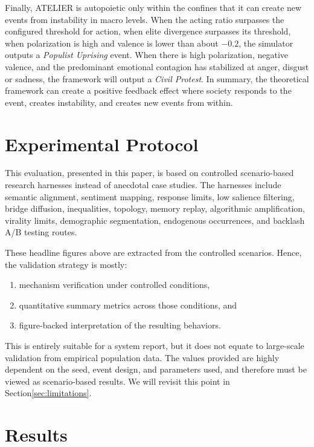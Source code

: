 \documentclass[12pt]{IEEEtran}
\begin{document}
Finally, ATELIER is autopoietic only within the confines that it can create new events from instability in macro levels. When the acting ratio surpasses the configured threshold for action, when elite divergence surpasses its threshold, when polarization is high and valence is lower than about $-0.2$, the simulator outputs a \emph{Populist Uprising} event. When there is high polarization, negative valence, and the predominant emotional contagion has stabilized at anger, disgust or sadness, the framework will output a \emph{Civil Protest}. In summary, the theoretical framework can create a positive feedback effect where society responds to the event, creates instability, and creates new events from within.

\section{Experimental Protocol}
\label{sec:protocol}
This evaluation, presented in this paper, is based on controlled scenario-based research harnesses instead of anecdotal case studies. The harnesses include semantic alignment, sentiment mapping, response limits, low salience filtering, bridge diffusion, inequalities, topology, memory replay, algorithmic amplification, virality limits, demographic segmentation, endogenous occurrences, and backlash A/B testing routes.

These headline figures above are extracted from the controlled scenarios. Hence, the validation strategy is mostly:

\begin{enumerate}
    \item mechanism verification under controlled conditions,
    \item quantitative summary metrics across those conditions, and
    \item figure-backed interpretation of the resulting behaviors.
\end{enumerate}

This is entirely suitable for a system report, but it does not equate to large-scale validation from empirical population data. The values provided are highly dependent on the seed, event design, and parameters used, and therefore must be viewed as scenario-based results. We will revisit this point in Section\ref{sec:limitations}.

\section{Results}
\label{sec:results}
\end{document}
